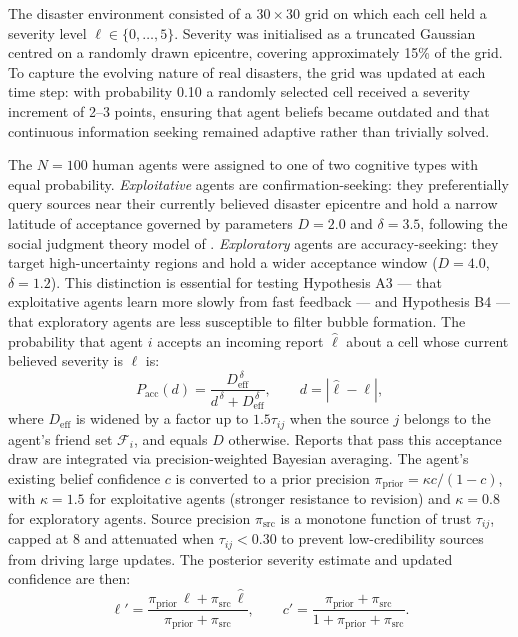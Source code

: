 \documentclass[pdflatex,sn-apa]{sn-jnl}%
\begin{document}
The disaster environment consisted of a $30\times30$ grid on which
each cell held a severity level $\ell\in\{0,\ldots,5\}$.
Severity was initialised as a truncated Gaussian centred on a
randomly drawn epicentre, covering approximately 15\% of the grid.
To capture the evolving nature of real disasters, the grid was
updated at each time step: with probability 0.10 a randomly
selected cell received a severity increment of 2--3 points,
ensuring that agent beliefs became outdated and that continuous
information seeking remained adaptive rather than trivially solved.

The $N=100$ human agents were assigned to one of two cognitive
types with equal probability.
\emph{Exploitative} agents are confirmation-seeking: they
preferentially query sources near their currently believed disaster
epicentre and hold a narrow latitude of acceptance governed by
parameters $D=2.0$ and $\delta=3.5$, following the social judgment
theory model of \citet{Geschke2019}.
\emph{Exploratory} agents are accuracy-seeking: they target
high-uncertainty regions and hold a wider acceptance window
($D=4.0$, $\delta=1.2$).
This distinction is essential for testing Hypothesis A3 --- that
exploitative agents learn more slowly from fast feedback --- and
Hypothesis B4 --- that exploratory agents are less susceptible to
filter bubble formation.
The probability that agent $i$ accepts an incoming report $\hat\ell$
about a cell whose current believed severity is $\ell$ is:
%
\begin{equation}
  P_\mathrm{acc}(d) =
  \frac{D_\mathrm{eff}^{\,\delta}}{d^{\,\delta}+D_\mathrm{eff}^{\,\delta}},
  \qquad d = |\hat\ell - \ell|,
  \label{eq:accept}
\end{equation}
%
where $D_\mathrm{eff}$ is widened by a factor up to $1.5\tau_{ij}$
when the source $j$ belongs to the agent's friend set
$\mathcal{F}_i$, and equals $D$ otherwise.
Reports that pass this acceptance draw are integrated via
precision-weighted Bayesian averaging.
The agent's existing belief confidence $c$ is converted to a prior
precision $\pi_\mathrm{prior}=\kappa c/(1-c)$, with $\kappa=1.5$
for exploitative agents (stronger resistance to revision) and
$\kappa=0.8$ for exploratory agents.
Source precision $\pi_\mathrm{src}$ is a monotone function of trust
$\tau_{ij}$, capped at 8 and attenuated when $\tau_{ij}<0.30$
to prevent low-credibility sources from driving large updates.
The posterior severity estimate and updated confidence are then:
%
\begin{equation}
  \ell' = \frac{\pi_\mathrm{prior}\,\ell +
                \pi_\mathrm{src}\,\hat\ell}
               {\pi_\mathrm{prior}+\pi_\mathrm{src}},
  \qquad
  c' = \frac{\pi_\mathrm{prior}+\pi_\mathrm{src}}
            {1+\pi_\mathrm{prior}+\pi_\mathrm{src}}.
  \label{eq:bayes}
\end{equation}
\end{document}
